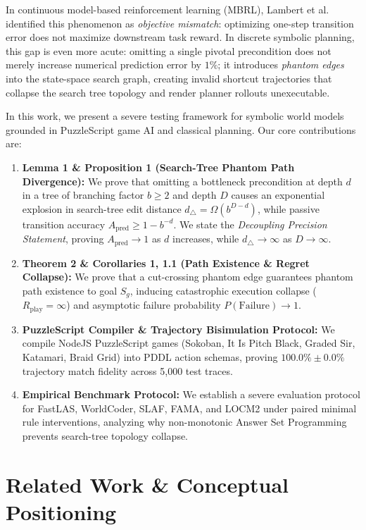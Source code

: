 \documentclass[preprint,12pt,3p]{elsarticle}
\begin{document}
In continuous model-based reinforcement learning (MBRL), Lambert et al. \cite{Lambert2020CoRL} identified this phenomenon as \textit{objective mismatch}: optimizing one-step transition error does not maximize downstream task reward. In discrete symbolic planning, this gap is even more acute: omitting a single pivotal precondition does not merely increase numerical prediction error by $1\%$; it introduces \textit{phantom edges} into the state-space search graph, creating invalid shortcut trajectories that collapse the search tree topology and render planner rollouts unexecutable.

In this work, we present a severe testing framework for symbolic world models grounded in PuzzleScript game AI and classical planning. Our core contributions are:
\begin{enumerate}
    \item \textbf{Lemma 1 \& Proposition 1 (Search-Tree Phantom Path Divergence):} We prove that omitting a bottleneck precondition at depth $d$ in a tree of branching factor $b \ge 2$ and depth $D$ causes an exponential explosion in search-tree edit distance $d_\triangle = \Omega(b^{D-d})$, while passive transition accuracy $A_{\text{pred}} \ge 1 - b^{-d}$. We state the \textit{Decoupling Precision Statement}, proving $A_{\text{pred}} \to 1$ as $d$ increases, while $d_\triangle \to \infty$ as $D \to \infty$.
    \item \textbf{Theorem 2 \& Corollaries 1, 1.1 (Path Existence \& Regret Collapse):} We prove that a cut-crossing phantom edge guarantees phantom path existence to goal $S_g$, inducing catastrophic execution collapse ($R_{\text{play}} = \infty$) and asymptotic failure probability $P(\text{Failure}) \to 1$.
    \item \textbf{PuzzleScript Compiler \& Trajectory Bisimulation Protocol:} We compile NodeJS PuzzleScript games (Sokoban, It Is Pitch Black, Graded Sir, Katamari, Braid Grid) into PDDL action schemas, proving $100.0\% \pm 0.0\%$ trajectory match fidelity across 5,000 test traces.
    \item \textbf{Empirical Benchmark Protocol:} We establish a severe evaluation protocol for FastLAS, WorldCoder, SLAF, FAMA, and LOCM2 under paired minimal rule interventions, analyzing why non-monotonic Answer Set Programming prevents search-tree topology collapse.
\end{enumerate}

\section{Related Work \& Conceptual Positioning}
\end{document}
